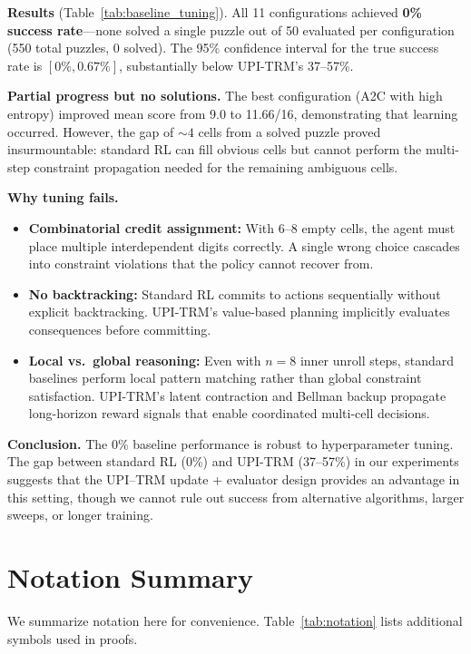 \documentclass{article}
\theoremstyle{plain}
\theoremstyle{definition}
\theoremstyle{remark}
\begin{document}
\textbf{Results} (Table~\ref{tab:baseline_tuning}).
All 11 configurations achieved \textbf{0\% success rate}---none solved a single puzzle out of 50 evaluated per configuration (550 total puzzles, 0 solved).
The 95\% confidence interval for the true success rate is $[0\%, 0.67\%]$, substantially below UPI-TRM's 37--57\%.

\textbf{Partial progress but no solutions.}
The best configuration (A2C with high entropy) improved mean score from 9.0 to 11.66/16, demonstrating that learning occurred.
However, the gap of ${\sim}4$ cells from a solved puzzle proved insurmountable: standard RL can fill obvious cells but cannot perform the multi-step constraint propagation needed for the remaining ambiguous cells.

\textbf{Why tuning fails.}
\begin{itemize}[nosep]
\item \textbf{Combinatorial credit assignment:} With 6--8 empty cells, the agent must place multiple interdependent digits correctly. A single wrong choice cascades into constraint violations that the policy cannot recover from.
\item \textbf{No backtracking:} Standard RL commits to actions sequentially without explicit backtracking. UPI-TRM's value-based planning implicitly evaluates consequences before committing.
\item \textbf{Local vs.\ global reasoning:} Even with $n{=}8$ inner unroll steps, standard baselines perform local pattern matching rather than global constraint satisfaction. UPI-TRM's latent contraction and Bellman backup propagate long-horizon reward signals that enable coordinated multi-cell decisions.
\end{itemize}

\textbf{Conclusion.}
The 0\% baseline performance is robust to hyperparameter tuning.
The gap between standard RL (0\%) and UPI-TRM (37--57\%) in our experiments suggests that the UPI--TRM update + evaluator design provides an advantage in this setting, though we cannot rule out success from alternative algorithms, larger sweeps, or longer training.

\section{Notation Summary}
\label{app:notation}

We summarize notation here for convenience.
Table~\ref{tab:notation} lists additional symbols used in proofs.
\end{document}
